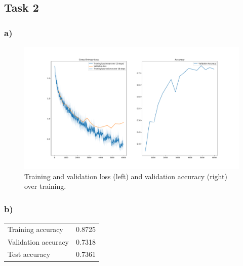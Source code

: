 \subsection*{Task 2}

\subsubsection*{a)}

\begin{figure}[h!]
  \centering
  \includegraphics[clip, trim=3cm 2cm 3cm 2cm, width=\textwidth]{figures/Task2a.pdf}
  \caption{Training and validation loss (left) and validation accuracy (right) over training.}
  \label{fig:task2:a}
\end{figure}

\subsubsection*{b)}

\begin{table}[h!]
  \centering
  \begin{tabular}{|l|c|}
    \hline
    Training accuracy & 0.8725 \\
    Validation accuracy & 0.7318 \\
    Test accuracy & 0.7361 \\
    \hline
  \end{tabular}
\end{table}
